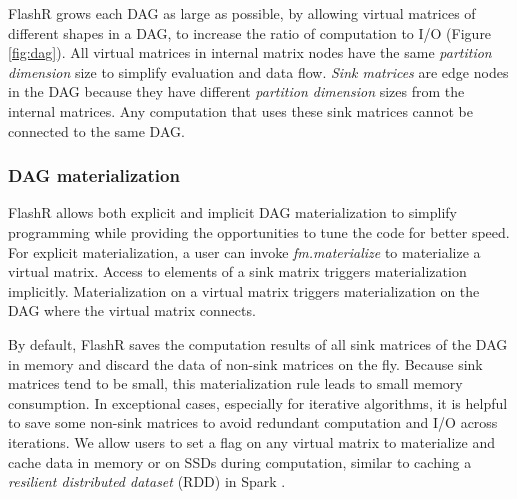 FlashR grows each DAG as large as possible, by allowing virtual matrices
of different shapes in a DAG, to increase the ratio of computation to I/O
(Figure \ref{fig:dag}). All virtual matrices in internal matrix nodes have
the same \textit{partition dimension} size to simplify evaluation and data
flow. \textit{Sink matrices} are edge nodes
in the DAG because they have different \textit{partition dimension} sizes
from the internal matrices. Any computation that uses these
sink matrices cannot be connected to the same DAG.  

\subsubsection{DAG materialization}
FlashR allows both explicit and implicit DAG materialization to simplify
programming while providing the opportunities to tune the code for
better speed. For explicit materialization, a user can invoke
\textit{fm.materialize} to materialize a virtual matrix. Access to elements
of a sink matrix triggers materialization implicitly. Materialization on
a virtual matrix triggers materialization on the DAG where the virtual
matrix connects.

By default, FlashR saves the computation results of all sink matrices of
the DAG in memory and discard the data of non-sink matrices on the fly.
Because sink matrices tend to be small, this materialization
rule leads to small memory consumption.
In exceptional cases, especially for iterative algorithms,
it is helpful to save some non-sink matrices to avoid
redundant computation and I/O across iterations.  We allow users to
set a flag on any virtual matrix to materialize and cache data in memory
or on SSDs during computation, similar to caching
a \textit{resilient distributed dataset} (RDD) in Spark \cite{spark}.

